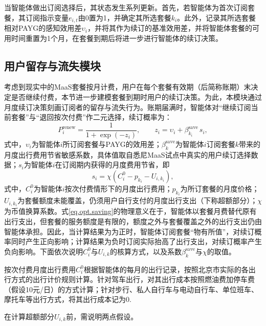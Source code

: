 当智能体做出订阅选择后，其状态发生系列更新。首先，若智能体为首次订阅套餐，其订阅指示变量$e_{i,t}$由0置为1，并确定其所选套餐$k_{i}$。此外，记录其所选套餐相对PAYG的感知效用差$\upsilon_{i}$，并将其作为续订的基准效用差，并将智能体套餐的可用时间重置为1个月，在套餐到期后将进一步进行智能体的续订决策。

\subsection{用户留存与流失模块}\label{subsec.opt.abm.churn}

考虑到现实中的MaaS套餐按月计费，用户在每个套餐有效期（后简称账期）末决定是否继续付费\citep{hoDriversParticipantsChoices2021}，本节进一步建模套餐到期时用户的续订决策。为此，本模块通过月度续订决策刻画订阅者的留存与流失行为。账期届满时，智能体对``继续订阅当前套餐''与``退回按次付费''作二元选择，续订概率为：
\begin{equation}
P_{i}^{\mathrm{renew}} = \frac{1}{1+\exp\left(-z_{i}\right)},\qquad
z_{i} = \upsilon_{i} + \beta_{k_{i}}^{\mathrm{save}}\,s_{i},
\label{eq.opt.renew}
\end{equation}
式中，$\upsilon_{i}$为智能体$i$所订阅套餐与PAYG的效用差；$\beta_{k}^{\mathrm{save}}$为智能体$i$订阅套餐$k$带来的月度出行费用节省敏感系数，具体值取自悉尼MaaS试点中真实的用户续订选择数据\citep{hoDriversParticipantsChoices2021}；$s_{i}$为智能体$i$在订阅期内获得的月度费用节省，即
\begin{equation}
s_{i} = \chi\left(C_{i}^{0}-p_{k_{i}}-U_{i,k_{i}}\right),
\label{eq.opt.saving}
\end{equation}
式中，$C_{i}^{0}$为智能体$i$按次付费情形下的月度出行费用；$p_{k_{i}}$为所订套餐的月度价格；$U_{i,k_{i}}$为套餐额度未能覆盖，仍须用户自行支付的月度出行支出（下称超额部分）；$\chi$为币值换算系数。式\eqref{eq.opt.saving}的物理意义在于，智能体以套餐月费替代原有出行支出，但套餐的服务额度是有限的，额度之外与套餐覆盖之外的出行支出仍由智能体承担。因此，当计算结果为为正时，智能体订阅套餐``物有所值''，对续订概率同时产生正向影响；计算结果为负时订阅实际抬高了出行支出，对续订概率产生负向影响。下面依次说明$C_{i}^{0}$与$U_{i,k}$的核算方式，以及系数$\beta_{k}^{\mathrm{save}}$与$\chi$的取值。

按次付费月度出行费用$C_{i}^{0}$根据智能体的每月的出行记录，按照北京市实际的各出行方式的出行计价规则计算。针对驾车出行，对其出行成本按照燃油费加停车费（假设10元/日）的方式计算；针对步行、私人自行车与电动自行车、单位班车、摩托车等出行方式，将其出行成本记为0.

在计算超额部分$U_{i,k}$前，需说明两点假设。

